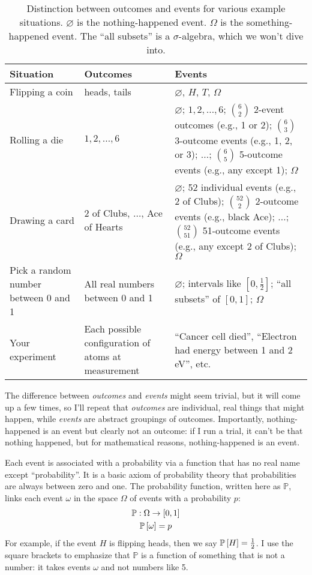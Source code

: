 \begin{table}
\centering
\begin{tabular}{p{3cm}p{4cm}p{6cm}}
\toprule
Situation & Outcomes & Events \\
\midrule
Flipping a coin & heads, tails & $\varnothing$, $H$, $T$, $\Omega$ \\
Rolling a die & $1, 2, \ldots, 6$ & $\varnothing$; $1, 2, \ldots, 6$; $\binom{6}{2}$ 2-event outcomes (e.g., 1 or 2); $\binom{6}{3}$ 3-outcome events (e.g., 1, 2, or 3); $\ldots$; $\binom{6}{5}$ 5-outcome events (e.g., any except 1); $\Omega$ \\
Drawing a card & 2 of Clubs, $\ldots$, Ace of Hearts & $\varnothing$; 52 individual events (e.g., 2 of Clubs); $\binom{52}{2}$ 2-outcome events (e.g., black Ace); $\ldots$; $\binom{52}{51}$ 51-outcome events (e.g., any except 2 of Clubs); $\Omega$ \\
Pick a random number between 0 and 1 & All real numbers between 0 and 1 & $\varnothing$; intervals like $[0, \tfrac{1}{2}]$; ``all subsets'' of $[0, 1]$; $\Omega$ \\
Your experiment & Each possible configuration of atoms at measurement & ``Cancer cell died'', ``Electron had energy between 1 and 2 eV'', etc. \\
\bottomrule
\end{tabular}
\caption{Distinction between outcomes and events for various example situations. $\varnothing$ is the nothing-happened event. $\Omega$ is the something-happened event. The ``all subsets'' is a $\sigma$-algebra, which we won't dive into.}
\label{tab:outcome-event}
\end{table}

The difference between \emph{outcomes} and \emph{events} might seem trivial,
but it will come up a few times, so I'll repeat that \emph{outcomes} are
individual, real things that might happen, while \emph{events} are abstract
groupings of outcomes. Importantly, nothing-happened is an event but clearly
not an outcome: if I run a trial, it can't be that nothing happened, but
for mathematical reasons, nothing-happened is an event.

Each event is associated with a probability via a function that has no real
name except ``probability''. It is a basic axiom of probability theory that
probabilities are always between zero and one. The probability function, written
here as $\mathbb{P}$, links each event $\omega$ in the space $\Omega$ of
events with a probability $p$:
\begin{gather*}
\mathbb{P} : \Omega \to [0, 1] \\
\mathbb{P}\left[{\omega}\right] = p
\end{gather*}
For example, if the event $H$ is flipping heads, then we say
$\mathbb{P}\left[{H}\right] = \tfrac{1}{2}$. I use the square brackets to emphasize
that $\mathbb{P}$ is a function of something that is not a number: it takes
events $\omega$ and not numbers like 5.

